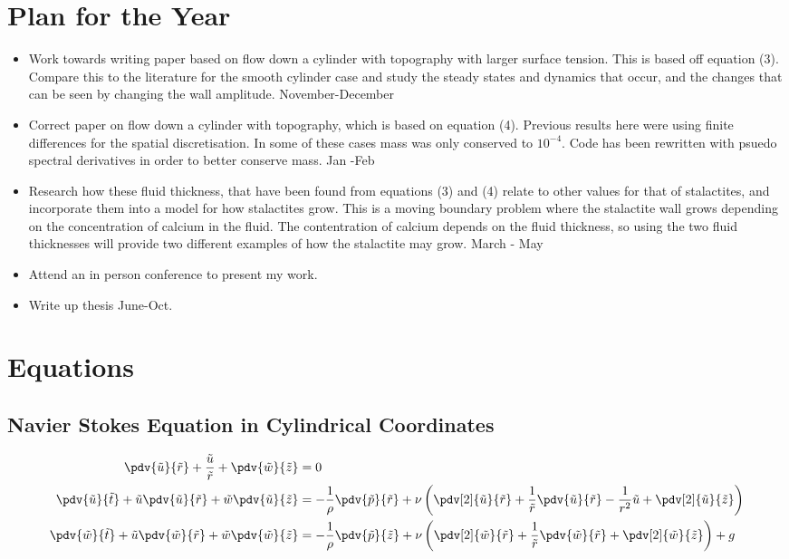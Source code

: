 \documentclass[12pt]{article}
\begin{document}
\section{Plan for the Year}
\begin{itemize}
\item Work towards writing paper based on flow down a cylinder with topography with larger surface tension. This is based off equation (3). Compare this to the literature for the smooth cylinder case and study the steady states and dynamics that occur, and the changes that can be seen by changing the wall amplitude.  November-December
\item Correct paper on flow down a cylinder with topography, which is based on equation (4). Previous results here were using finite differences for the spatial discretisation. In some of these cases mass was only conserved to $10^{-4}$. Code has been rewritten with psuedo spectral derivatives in order to better conserve mass.  Jan -Feb
\item Research how these fluid thickness, that have been found from equations (3) and (4) relate to other values for that of stalactites, and incorporate them into a model for how stalactites grow. This is a moving boundary problem where the stalactite wall grows depending on the concentration of calcium in the fluid. The contentration of calcium depends on the fluid thickness, so using the two fluid thicknesses will provide two different examples of how the stalactite may grow.  March - May
\item Attend an in person conference to present my work.
\item Write up thesis June-Oct.
\end{itemize}
\appendix
\section{Equations}
\subsection{Navier Stokes Equation in Cylindrical Coordinates \label{eqs}}

\begin{align}
\pdv{\tilde u}{\tilde r}+\frac{\tilde u}{\tilde r}+\pdv{\tilde w}{\tilde z}&=0\\
\pdv{\tilde u}{\tilde t}+\tilde u\pdv{\tilde u}{\tilde r}+\tilde w\pdv{\tilde u}{\tilde z}&=-\frac{1}{\rho}\pdv{\tilde p}{\tilde r}+\nu\left(\pdv[2]{\tilde u}{\tilde r}+\frac{1}{\tilde r}\pdv{\tilde u}{\tilde r}-\frac{1}{r^2}\tilde u+\pdv[2]{\tilde u}{\tilde z}\right)\\
\pdv{\tilde w}{\tilde t}+\tilde u\pdv{\tilde w}{\tilde r}+\tilde w\pdv{\tilde w}{\tilde z}&=-\frac{1}{\rho}\pdv{\tilde p}{\tilde z}+\nu\left(\pdv[2]{\tilde w}{\tilde r}+\frac{1}{\tilde r}\pdv{\tilde w}{\tilde r}+\pdv[2]{\tilde w}{\tilde z}\right) + g 
\end{align}
\end{document}
